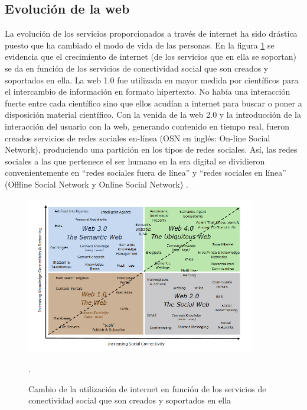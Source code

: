 \subsection{Evolución de la web}

La evolución de los servicios proporcionados a través de internet ha sido drástica puesto que ha cambiado el modo de vida de las personas. En la figura \ref{fig:utilizacion_internet} se evidencia que el crecimiento de internet (de los servicios que en ella se soportan) se da en función de los servicios de conectividad social que son creados y soportados en ella. La web 1.0 fue utilizada en mayor medida por científicos para el intercambio de información en formato hipertexto. No había una interacción fuerte entre cada científico sino que ellos acudían a internet para buscar o poner a disposición material científico. Con la venida de la web 2.0 y la introducción de la interacción del usuario con la web, generando contenido en tiempo real, fueron creados servicios de redes sociales en-línea (OSN en inglés: On-line Social Network), produciendo una partición en los tipos de redes sociales. Así, las redes sociales a las que pertenece el ser humano en la era digital se dividieron convenientemente en “redes sociales fuera de línea” y “redes sociales en línea” (Offline Social Network y Online Social Network) \cite{dynamics}.

\begin{figure}[!htb]
  \begin{center}
    \includegraphics[width=10cm]{./imagenes/utilizacion_internet.png}
    \caption{Cambio de la utilización de internet en función de los servicios de conectividad social que son creados y soportados en ella}
    \cite{evolucion_web}.
    \label{fig:utilizacion_internet}
  \end{center}
\end{figure}
